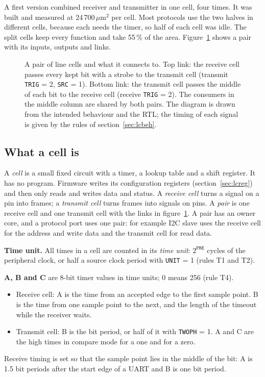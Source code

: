 \documentclass[10pt,a4paper]{article}
\newcommand{\reg}[1]{\texttt{#1}}
\begin{document}
A first version combined receiver and transmitter in one cell, four times. It was built and measured at
24\,700\,$\mu$m$^2$ per cell. Most protocols use the two halves in different cells, because each needs the
timer, so half of each cell was idle. The split cells keep every function and take 55\,\% of the area. Figure~\ref{fig:pair} shows a pair with its
inputs, outputs and links.

\begin{figure}[!htb]
\centering
\resizebox{\textwidth}{!}{}
\caption{A pair of line cells and what it connects to. Top link: the receive cell passes every kept bit with a
strobe to the transmit cell (transmit \reg{TRIG} = 2, \reg{SRC} = 1). Bottom link: the transmit cell passes the
middle of each bit to the receive cell (receive \reg{TRIG} = 2). The consumers in the middle column are
shared by both pairs. The diagram is drawn from the intended behaviour and the RTL; the timing of each signal
is given by the rules of section~\ref{sec:lcbeh}.}
\label{fig:pair}
\end{figure}

\subsection{What a cell is}

A \emph{cell} is a small fixed circuit with a timer, a lookup table and a shift register. It has no program.
Firmware writes its configuration registers (section~\ref{sec:lcreg}) and then only reads and writes data and
status. A \emph{receive cell} turns a signal on a pin into frames; a \emph{transmit cell} turns frames into
signals on pins. A \emph{pair} is one receive cell and one transmit cell with the links in
figure~\ref{fig:pair}. A pair has an owner core, and a protocol port uses one pair: for example I2C slave uses
the receive cell for the address and write data and the transmit cell for read data.

\textbf{Time unit.} All times in a cell are counted in its \emph{time unit}: $2^{\mathtt{PRE}}$ cycles of the
peripheral clock, or half a source clock period with \reg{UNIT} = 1 (rules T1 and T2).

\textbf{A, B and C} are 8-bit timer values in time units; 0 means 256 (rule T4).
\begin{itemize}
\item Receive cell: A is the time from an accepted edge to the first sample point. B is the time from one sample
point to the next, and the length of the timeout while the receiver waits.
\item Transmit cell: B is the bit period, or half of it with \reg{TWOPH} = 1. A and C are the high times in
compare mode for a one and for a zero.
\end{itemize}
Receive timing is set so that the sample point lies in the middle of the bit: A is 1.5 bit periods after the
start edge of a UART and B is one bit period.
\end{document}
